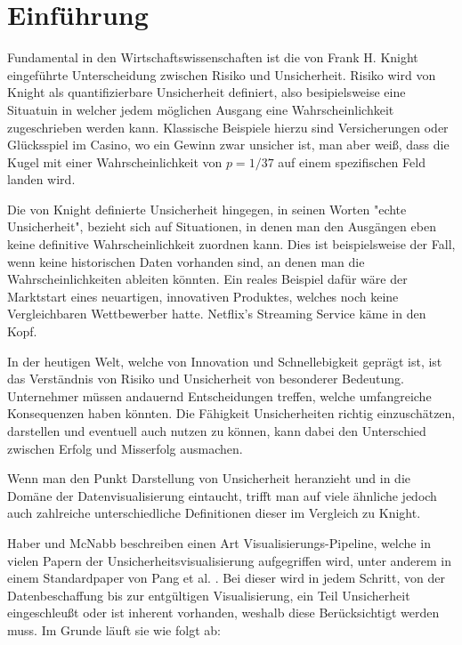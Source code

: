 \section{Einführung}

Fundamental in den Wirtschaftswissenschaften ist die von Frank H. Knight eingeführte Unterscheidung zwischen Risiko und Unsicherheit. Risiko wird von Knight als quantifizierbare 
Unsicherheit definiert, also besipielsweise eine Situatuin in welcher jedem möglichen Ausgang eine Wahrscheinlichkeit zugeschrieben werden kann. Klassische Beispiele hierzu sind 
Versicherungen oder Glücksspiel im Casino, wo ein Gewinn zwar unsicher ist, man aber weiß, dass die Kugel mit einer Wahrscheinlichkeit von $p = 1/37$ auf einem spezifischen Feld 
landen wird.

Die von Knight definierte Unsicherheit hingegen, in seinen Worten "echte Unsicherheit", bezieht sich auf Situationen, in denen man den Ausgängen eben keine definitive Wahrscheinlichkeit zuordnen kann.
Dies ist beispielsweise der Fall, wenn keine historischen Daten vorhanden sind, an denen man die Wahrscheinlichkeiten ableiten könnten. \cite{Knight1921} Ein reales Beispiel dafür wäre der Marktstart eines neuartigen, innovativen Produktes, 
welches noch keine Vergleichbaren Wettbewerber hatte. Netflix's Streaming Service käme in den Kopf. 

In der heutigen Welt, welche von Innovation und Schnellebigkeit geprägt ist, ist das Verständnis von Risiko und Unsicherheit von besonderer Bedeutung. Unternehmer müssen andauernd Entscheidungen treffen, welche umfangreiche Konsequenzen haben könnten. 
Die Fähigkeit Unsicherheiten richtig einzuschätzen, darstellen und eventuell auch nutzen zu können, kann dabei den Unterschied zwischen Erfolg und Misserfolg ausmachen. 

Wenn man den Punkt Darstellung von Unsicherheit heranzieht und in die Domäne der Datenvisualisierung eintaucht, trifft man auf viele ähnliche jedoch auch zahlreiche unterschiedliche Definitionen dieser 
im Vergleich zu Knight. 

Haber und McNabb \cite{Haber1990} beschreiben einen Art Visualisierungs-Pipeline, welche in vielen Papern der Unsicherheitsvisualisierung aufgegriffen wird, unter anderem in einem Standardpaper von Pang et al. \cite{Pang1997}.
Bei dieser wird in jedem Schritt, von der Datenbeschaffung bis zur entgültigen Visualisierung, ein Teil Unsicherheit eingeschleußt oder ist inherent vorhanden, weshalb diese Berücksichtigt werden muss. Im Grunde läuft sie wie folgt ab:


